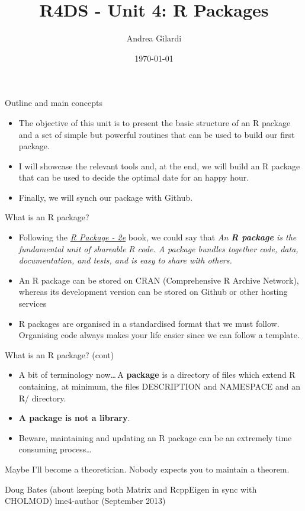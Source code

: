\documentclass[
hyperref={bookmarks=false},
xcolor={dvipsnames,svgnames*,x11names*}, 
12pt
]{beamer}
\title{R4DS - Unit 4: R Packages}
\author{Andrea Gilardi}
\date{\today}
\begin{document}
\inserttitlepage

\begin{frame}{Outline and main concepts}
\vspace{-0.5cm}
\begin{itemize}
\itemsep 3ex
\item The objective of this unit is to present the basic structure of an R package and a set of simple but powerful routines that can be used to build our first package. 
\item I will showcase the relevant tools and, at the end, we will build an R package that can be used to decide the optimal date for an happy hour. 
\item Finally, we will synch our package with Github. 
\end{itemize}
\end{frame}	

\begin{frame}{What is an R package?}
\vspace{-0.5cm}
\begin{itemize}
\itemsep 3ex
\item Following the \href{https://r-pkgs.org/}{\emph{R Package - 2e}} book, we could say that \emph{An \textbf{R package} is the fundamental unit of shareable R code. A package bundles together code, data, documentation, and tests, and is easy to share with others.} 
\item An R package can be stored on CRAN (Comprehensive R Archive Network), whereas its development version can be stored on Github or other hosting services 
\item R packages are organised in a standardised format that we must follow. Organising code always makes your life easier since we can follow a template. 
\end{itemize}
\end{frame}	

\begin{frame}{What is an R package? (cont)}
\vspace{-0.5cm}
\begin{itemize}
\itemsep 2ex
\item A bit of terminology now\dots\,A \textbf{package} is a directory of files which extend R containing, at minimum, the files DESCRIPTION and NAMESPACE and an R/ directory. 
\item \textbf{A package is not a library}. 
\item Beware, maintaining and updating an R package can be an extremely time consuming process\dots 
\end{itemize}
\vspace{-0.25cm}
\epigraph{Maybe I'll become a theoretician. Nobody expects you to maintain a theorem.}{Doug Bates (about keeping both Matrix and RcppEigen in sync with CHOLMOD) lme4-author (September 2013)}
\end{frame}
\end{document}
